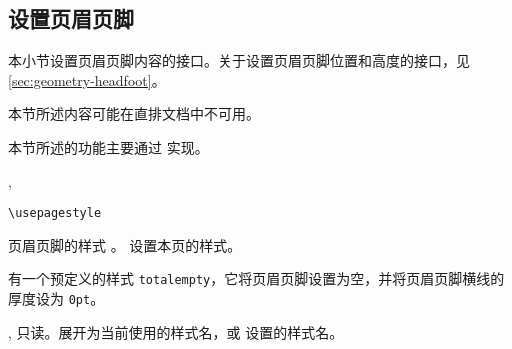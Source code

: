 \documentclass{cusdoc}
\begin{document}




\subsection{设置页眉页脚}\label{sec:pagestyle}

本小节设置页眉页脚内容的接口。关于设置页眉页脚位置和高度的接口，见\cref{sec:geometry-headfoot}。

本节所述内容可能在直排文档中不可用。

本节所述的功能主要通过  实现。

\begin{function}{\usepagestyle, \usethispagestyle}
  \begin{syntax}
    \verb|\usepagestyle| 
  \end{syntax}
 页眉页脚的样式 。 设置本页的样式。

有一个预定义的样式 \texttt{totalempty}，它将页眉页脚设置为空，并将页眉页脚横线的厚度设为 \texttt{0pt}。
\end{function}

\begin{function}[EXP]{\@currpagestyle, \@specialstyle}
只读。展开为当前使用的样式名，或  设置的样式名。
\end{function}
\end{document}
